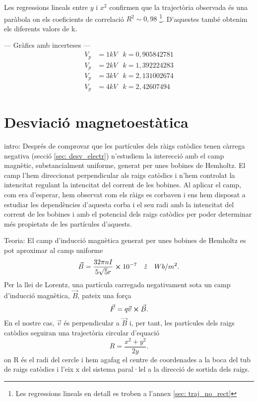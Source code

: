 \documentclass[11pt]{article}
\begin{document}
 Les regressions lineals entre $y$ i $x^2$ confirmen que la trajectòria observada és una paràbola on els coeficients de correlació $R^2 \sim 0,98$ \footnote{Les regressions lineals en detall es troben a l'annex \ref{sec: traj_no_rect}}. D'aquestes també obtenim els diferents valors de k.

--- Gràfics amb incerteses ---
\begin{align*}
    V_p &= 1kV      & k = 0,905842781 \\
    V_p &= 2kV      & k = 1,392224283 \\
    V_p &= 3kV      & k = 2,131002674 \\
    V_p &= 4kV      & k = 2,42607494 
\end{align*}




\section{Desviació magnetoestàtica}\label{sec: desv_magn}
intro: Després de comprovar que les partícules dels ràigs catòdics tenen càrrega negativa (secció \ref{sec: desv_electr}) n'estudiem la interecció amb el camp magnètic, substancialment uniforme, generat per unes bobines de Hemholtz. 
El camp l'hem direccionat perpendicular als raigs catòdics i n'hem controlat la intencitat regulant la intencitat del corrent de les bobines. Al aplicar el camp, com era d'esperar, hem observat com els ràigs es corbaven i ens hem disposat a estudiar les dependències d'aquesta corba i el seu radi amb la intencitat del corrent de les bobines i amb el potencial dels raigs catòdics per poder determinar més propietats de les partícules d'aquests. 

Teoria: 
El camp d'inducció magnètica generat per unes bobines de Hemholtz es pot aproximar al camp uniforme 
\begin{equation}
    \vec{B}=\frac{32\pi nI}{5\sqrt{5}r}\cross10^{-7} \quad \hat{z}\quad Wb/m^2.
    \label{eq: B}
\end{equation}
Per la llei de Lorentz, una partícula carregada negativament sota un camp d'inducció magnètica, $\vec{B}$, pateix una força
\begin{equation}
    \vec{F}=q\vec{v}\cross\vec{B}.
    \label{eq: Lorentz} 
\end{equation} 
En el nostre cas, $\vec{v}$ és perpendicular a $\vec{B }$ i, per tant, les partícules dels raigs catòdics seguiran una trajectòria circular d'equació
\begin{equation}
    R=\frac{x^2+y^2}{2y}.
    \label{eq: radi}
\end{equation}
on R és el radi del cercle i hem agafag el centre de coordenades a la boca del tub de raigs catòdics i l'eix x del sistema paral·lel a la direcció de sortida dels raigs.
\end{document}

